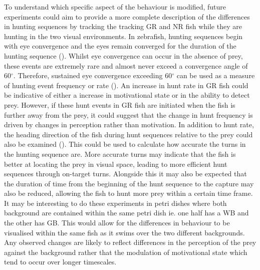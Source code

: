 To understand which specific aspect of the behaviour is modified, future experiments could aim to provide a more complete description of the differences in hunting sequences by tracking the tracking GR and NR fish while they are hunting in the two visual environments. In zebrafish, hunting sequences begin with eye convergence and the eyes remain converged for the duration of the hunting sequence (\cite{Bianco2011}). Whilst eye convergence can occur in the absence of prey, these events are extremely rare and almost never exceed a convergence angle of 60$^{\circ}$. Therefore, sustained eye convergence exceeding 60$^{\circ}$ can be used as a measure of hunting event frequency or rate (\cite{Lagogiannis2019LearningLarvae}). An increase in hunt rate in GR fish could be indicative of either a increase in motivational state or in the ability to detect prey. However, if these hunt events in GR fish are initiated when the fish is further away from the prey, it could suggest that the change in hunt frequency is driven by changes in perception rather than motivation. In addition to hunt rate, the heading direction of the fish during hunt sequences relative to the prey could also be examined (\cite{Avitan2019}). This could be used to calculate how accurate the turns in the hunting sequence are. More accurate turns may indicate that the fish is better at locating the prey in visual space, leading to more efficient hunt sequences through on-target turns. Alongside this it may also be expected that the duration of time from the beginning of the hunt sequence to the capture may also be reduced, allowing the fish to hunt more prey within a certain time frame. It may be interesting to do these experiments in petri dishes where both background are contained within the same petri dish ie. one half has a WB and the other has GB. This would allow for the differences in behaviour to be visualised within the same fish as it swims over the two different backgrounds. Any observed changes are likely to reflect differences in the perception of the prey against the background rather that the modulation of motivational state which tend to occur over longer timescales.

